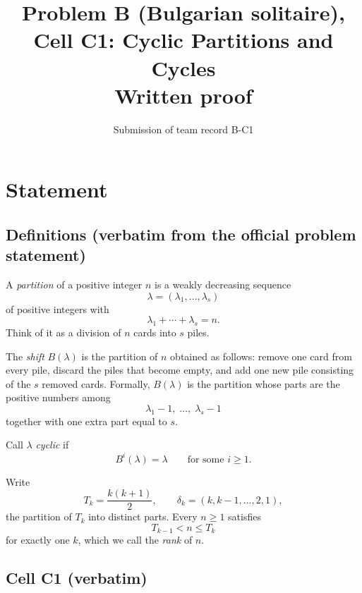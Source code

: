 \documentclass[11pt]{article}
\title{Problem B (Bulgarian solitaire), Cell C1: Cyclic Partitions and Cycles\\[4pt]
\large Written proof}
\author{Submission of team record B-C1}
\date{}
\begin{document}
\maketitle

\begin{center}
\end{center}

\section{Statement}

\subsection*{Definitions (verbatim from the official problem statement)}

A \emph{partition} of a positive integer $n$ is a weakly decreasing sequence
\[
\lambda=(\lambda_1,\ldots,\lambda_s)
\]
of positive integers with
\[
\lambda_1+\cdots+\lambda_s=n.
\]
Think of it as a division of $n$ cards into $s$ piles.

The \emph{shift} $B(\lambda)$ is the partition of $n$ obtained as follows: remove one card from every pile,
discard the piles that become empty, and add one new pile consisting of the $s$ removed cards. Formally,
$B(\lambda)$ is the partition whose parts are the positive numbers among
\[
\lambda_1-1,\;\ldots,\;\lambda_s-1
\]
together with one extra part equal to $s$.

Call $\lambda$ \emph{cyclic} if
\[
B^i(\lambda)=\lambda\qquad\text{for some } i\ge 1.
\]

Write
\[
T_k=\frac{k(k+1)}{2},\qquad \delta_k=(k,k-1,\ldots,2,1),
\]
the partition of $T_k$ into distinct parts. Every $n\ge 1$ satisfies
\[
T_{k-1}<n\le T_k
\]
for exactly one $k$, which we call the \emph{rank} of $n$.

\subsection*{Cell C1 (verbatim)}
\end{document}
